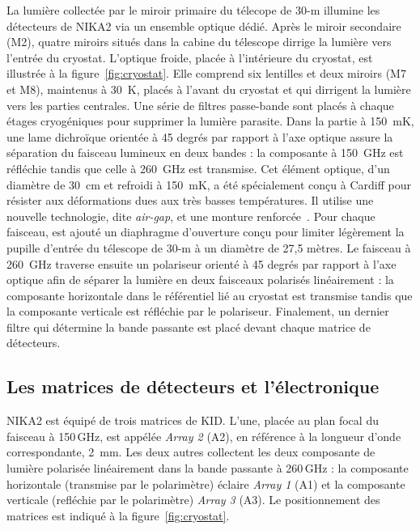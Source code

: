 La lumière collectée par le miroir primaire du télecope de 30-m
illumine les détecteurs de NIKA2 via un ensemble optique dédié. Après
le miroir secondaire (M2), quatre miroirs situés dans la cabine du
télescope dirrige la lumière vers l'entrée du cryostat. L'optique
froide, placée à l'intérieure du cryostat, est illustrée à la
figure~\ref{fig:cryostat}. Elle comprend six lentilles et deux miroirs
(M7 et M8), maintenus à 30~K, placés à l'avant du cryostat et qui
dirrigent la lumière vers les parties centrales. Une série de filtres
passe-bande sont placés à chaque étages cryogéniques pour supprimer la
lumière parasite. 
Dans la partie à 150~mK, une lame dichroïque orientée à 45
degrés par rapport à l'axe optique assure la séparation du faisceau
lumineux en deux bandes : la composante à 150~GHz est réfléchie
tandis que celle à 260~GHz est transmise. Cet élément optique, d'un
diamètre de 30~cm et refroidi à 150~mK, a été spécialement conçu à
Cardiff pour résister aux déformations dues aux très basses
températures. Il utilise une nouvelle technologie, dite
\emph{air-gap}, et une monture renforcée~\citep{Perotto2019}. Pour chaque faisceau, est
ajouté un diaphragme d'ouverture conçu pour limiter légèrement la
pupille d'entrée du télescope de 30-m à un diamètre de 27,5 mètres.   
Le faisceau à 260~GHz traverse ensuite un polariseur
orienté à 45 degrés par rapport à l'axe optique afin de séparer la lumière en
deux faisceaux polarisés linéairement : la composante horizontale dans
le référentiel lié au cryostat est transmise tandis que la composante
verticale est réfléchie par le polariseur.
Finalement, un dernier filtre qui détermine la bande passante est
placé devant chaque matrice de détecteurs.

\subsection{Les matrices de détecteurs et l'électronique}
\label{se:matrices}

NIKA2 est équipé de trois matrices de KID. L'une, placée au plan focal du
faisceau à 150\,GHz, est appélée \emph{Array 2} (A2), en référence à la
longueur d'onde correspondante, 2~mm. Les deux autres collectent les
deux composante de lumière polarisée linéairement dans la bande
passante à 260\,GHz : la composante horizontale (transmise par le
polarimètre) éclaire \emph{Array 1} (A1) et la composante verticale
(refléchie par le polarimètre) \emph{Array 3} (A3). Le positionnement
des matrices est indiqué à la figure~\ref{fig:cryostat}. 

